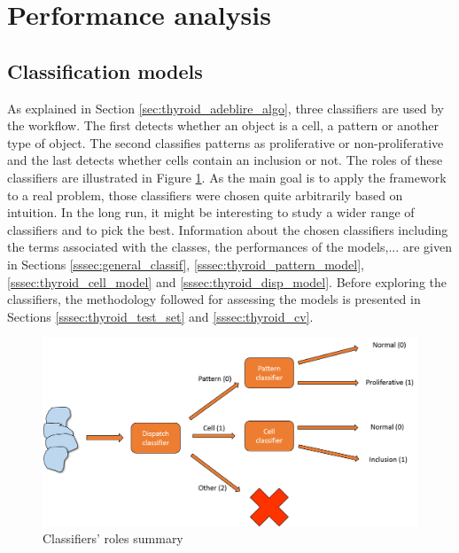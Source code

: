 \section{Performance analysis}
\label{sec:thyroid_perf}

\subsection{Classification models}
\label{ssec:thyroid_perf_models}

As explained in Section \ref{sec:thyroid_adeblire_algo}, three classifiers are used by the workflow. The first detects whether an object is a cell, a pattern or another type of object. The second classifies patterns as proliferative or non-proliferative and the last detects whether cells contain an inclusion or not. The roles of these classifiers are illustrated in Figure \ref{fig:summary_classif}. As the main goal is to apply the framework to a real problem, those classifiers were chosen quite arbitrarily based on intuition. In the long run, it might be interesting to study a wider range of classifiers and to pick the best. Information about the chosen classifiers including the terms associated with the classes, the performances of the models,... are given in Sections \ref{sssec:general_classif}, \ref{sssec:thyroid_pattern_model}, \ref{sssec:thyroid_cell_model} and \ref{sssec:thyroid_disp_model}. Before exploring the classifiers, the methodology followed for assessing the models is presented in Sections \ref{sssec:thyroid_test_set} and \ref{sssec:thyroid_cv}.

\begin{figure}
	\center
	\includegraphics[scale=0.5]{image/summary_classifiers.png}
	\caption{Classifiers' roles summary}
	\label{fig:summary_classif}
\end{figure}

